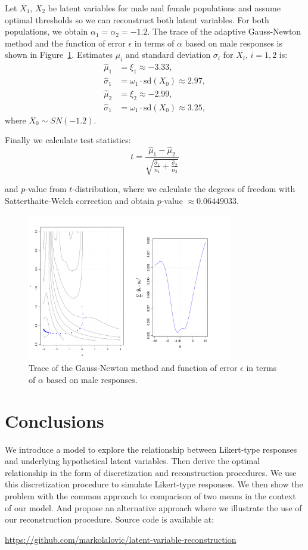\documentclass[10pt]{article}
\begin{document}
Let $X_{1}$, $X_{2}$ be latent variables for male and female populations and assume optimal thresholds so we can reconstruct both latent variables. For both populations, we obtain $\alpha_{1} = \alpha_{2} = -1.2$. The trace of the adaptive Gauss-Newton method and the function of error $\epsilon$ in terms of $\alpha$ based on male responses is shown in Figure~\ref{fig: estimates2}. Estimates $\mu_{i}$ and standard deviation $\sigma_{i}$ for $X_{i}$, $i = 1, 2$ is:
\begin{align*}
\hat{\mu}_{1} &= \xi_{1} \approx -3.33, \\
\hat{\sigma}_{1} &= \omega_{1} \cdot \mathrm{sd}(X_{0}) \approx 2.97, \\
\hat{\mu}_{2} &= \xi_{2} \approx -2.99, \\
\hat{\sigma}_{1} &= \omega_{1} \cdot \mathrm{sd}(X_{0}) \approx 3.25,
\end{align*}
where $X_{0} \sim SN(-1.2)$.

Finally we calculate test statistics:
\begin{equation}
t = \frac{\hat{\mu}_{1} - \hat{\mu}_{2}}{
\sqrt{\frac{\hat{\sigma}_{1}}{n_{1}} + \frac{\hat{\sigma}_{2}}{n_{2}}}
}
\end{equation}

and $p$-value from $t$-distribution, where we calculate the degrees of freedom with Satterthaite-Welch correction and obtain $p$-value $\approx 0.06449033$. 

\begin{figure}
\centering
\includegraphics[width=0.8\textwidth]{example_estimation.pdf}
\caption{ Trace of the Gauss-Newton method and function of error $\epsilon$ in terms of $\alpha$ based on male responses.}
\label{fig: estimates2}
\end{figure}

\section{Conclusions}
We introduce a model to explore the relationship between Likert-type responses and underlying hypothetical latent variables. Then derive the optimal relationship in the form of discretization and reconstruction procedures. We use this discretization procedure to simulate Likert-type responses. We then show the problem with the common approach to comparison of two means in the context of our model. And propose an alternative approach where we illustrate the use of our reconstruction procedure. Source code is available at:

\url{https://github.com/markolalovic/latent-variable-reconstruction}



\end{document}
